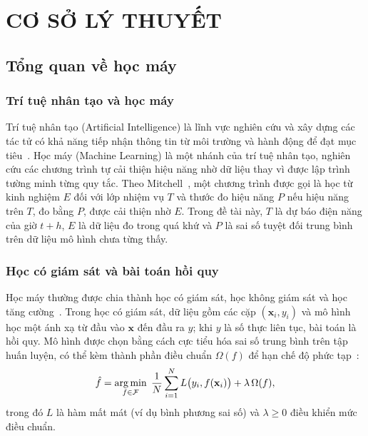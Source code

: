 \chapter{CƠ SỞ LÝ THUYẾT}
\label{chap:theory}

\section{Tổng quan về học máy}
\label{sec:ml_overview}

\subsection{Trí tuệ nhân tạo và học máy}
Trí tuệ nhân tạo (Artificial Intelligence) là lĩnh vực nghiên cứu và xây dựng các tác tử có khả năng tiếp nhận thông tin từ môi trường và hành động để đạt mục tiêu~\cite{russell2020artificial}. Học máy (Machine Learning) là một nhánh của trí tuệ nhân tạo, nghiên cứu các chương trình tự cải thiện hiệu năng nhờ dữ liệu thay vì được lập trình tường minh từng quy tắc. Theo Mitchell~\cite{mitchell1997machine}, một chương trình được gọi là học từ kinh nghiệm $E$ đối với lớp nhiệm vụ $T$ và thước đo hiệu năng $P$ nếu hiệu năng trên $T$, đo bằng $P$, được cải thiện nhờ $E$. Trong đề tài này, $T$ là dự báo điện năng của giờ $t+h$, $E$ là dữ liệu đo trong quá khứ và $P$ là sai số tuyệt đối trung bình trên dữ liệu mô hình chưa từng thấy.

\subsection{Học có giám sát và bài toán hồi quy}
Học máy thường được chia thành học có giám sát, học không giám sát và học tăng cường~\cite{russell2020artificial,hastie2009elements}. Trong học có giám sát, dữ liệu gồm các cặp $(\mathbf{x}_i, y_i)$ và mô hình học một ánh xạ từ đầu vào $\mathbf{x}$ đến đầu ra $y$; khi $y$ là số thực liên tục, bài toán là hồi quy. Mô hình được chọn bằng cách cực tiểu hóa sai số trung bình trên tập huấn luyện, có thể kèm thành phần điều chuẩn $\Omega(f)$ để hạn chế độ phức tạp~\cite{hastie2009elements}:
\begin{equation}
    \hat{f} = \operatorname*{arg\,min}_{f \in \mathcal{F}} \; \frac{1}{N}\sum_{i=1}^{N} L\big(y_i, f(\mathbf{x}_i)\big) + \lambda\,\Omega(f),
    \label{eq:erm}
\end{equation}
trong đó $L$ là hàm mất mát (ví dụ bình phương sai số) và $\lambda \ge 0$ điều khiển mức điều chuẩn.

